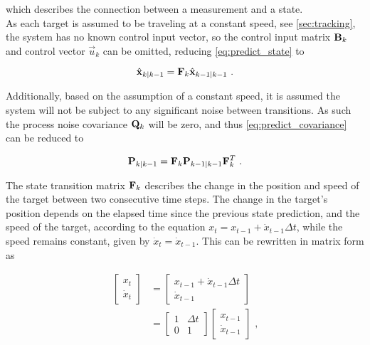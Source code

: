 which describes the connection between a measurement and a state. \\

As each target is assumed to be traveling at a constant speed, see \cref{sec:tracking}, the system has no known control input vector, so the control input matrix $\mathbf{B}_k$ and control vector $\vec{u}_k$ can be omitted, reducing \cref{eq:predict_state} to

\begin{equation}
\label{eq:reduced_predict_state}
  \hat{\mathbf{x}}_{k|k-1} = \mathbf{F}_k \hat{\mathbf{x}}_{k-1|k-1} \text{ .}
\end{equation}

Additionally, based on the assumption of a constant speed, it is assumed the system will not be subject to any significant noise between transitions. As such the process noise covariance $\mathbf{Q}_k$ will be zero, and thus \cref{eq:predict_covariance} can be reduced to

\begin{equation}
\label{eq:reduced_predict_covariance}
   \mathbf{P}_{k|k-1} = \mathbf{F}_k \mathbf{P}_{k-1|k-1} \mathbf{F}_k^T \text{ .}
\end{equation}

The state transition matrix $\mathbf{F}_k$ describes the change in the position and speed of the target between two consecutive time steps. The change in the target's position depends on the elapsed time since the previous state prediction, and the speed of the target, according to the equation $x_t = x_{t-1} + \dot{x}_{t-1} \Delta t $, while the speed remains constant, given by $\dot{x}_t = \dot{x}_{t-1}$. This can be rewritten in matrix form as

\begin{equation}
\label{eq:state_transition_calculation}
\begin{split}
  \begin{bmatrix}
  x_t \\
  \dot{x}_t
  \end{bmatrix}
      &=
  \begin{bmatrix}
    x_{t-1} + \dot{x}_{t-1} \Delta t \\
    \dot{x}_{t-1}
  \end{bmatrix}
  \\
      &=
     \begin{bmatrix}
      1 & \Delta t \\
      0 & 1
     \end{bmatrix}
     \begin{bmatrix}
      x_{t-1} \\
      \dot{x}_{t-1} 
     \end{bmatrix}
     \text{ ,}
\end{split}
\end{equation}

